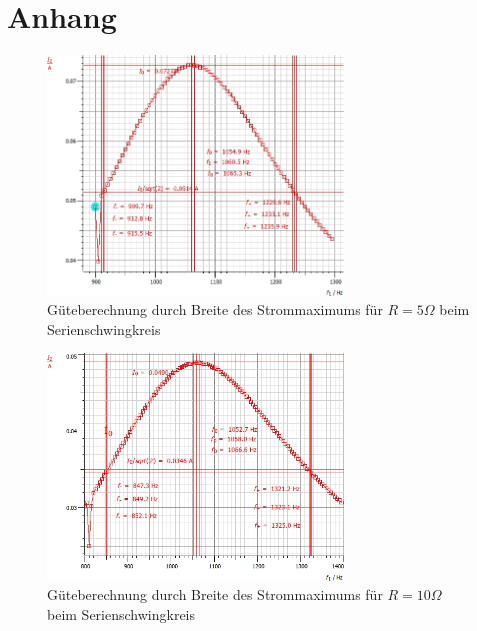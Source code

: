 \documentclass[12pt,a4paper]{article}
\begin{document}
\section{Anhang}
\begin{figure}[H]
	\centering
	\includegraphics[width=0.7\textwidth]{Daten/S5_f0.jpg}
	\caption{Güteberechnung durch Breite des Strommaximums für $R=5\Omega$ beim Serienschwingkreis}
\end{figure}
\begin{figure}[H]
	\centering
	\includegraphics[width=0.7\textwidth]{Daten/S10_f0.jpg}
	\caption{Güteberechnung durch Breite des Strommaximums für $R=10\Omega$ beim Serienschwingkreis}
\end{figure}
\end{document}
